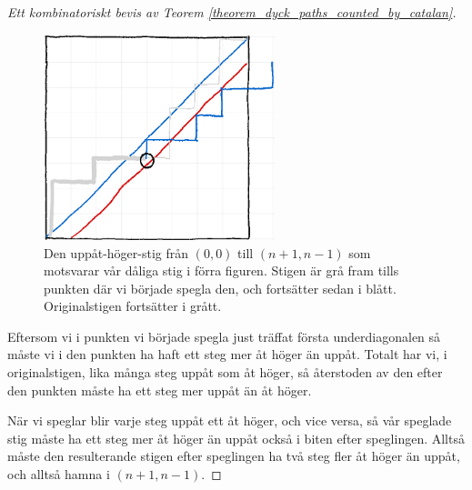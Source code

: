\documentclass{tufte-handout}
\begin{document}
\begin{proof}[Ett kombinatoriskt bevis av Teorem \ref{theorem_dyck_paths_counted_by_catalan}]
    \begin{figure}\label{fig:dyck_comb_proof_reflected_path}
        \centering
        \includegraphics[width = 0.6\textwidth]{graphics/dyck_combinatorial_proof_reflected_path.png}
        \caption{Den uppåt-höger-stig från $(0,0)$ till $(n+1,n-1)$ som motsvarar vår dåliga stig i förra figuren. Stigen är grå fram tills punkten där vi började spegla den, och fortsätter sedan i blått. Originalstigen fortsätter i grått.}
    \end{figure}

    Eftersom vi i punkten vi började spegla just träffat första underdiagonalen så måste vi i den punkten ha haft ett steg mer åt höger än uppåt. Totalt har vi, i originalstigen, lika många steg uppåt som åt höger, så återstoden av den efter den punkten måste ha ett steg mer uppåt än åt höger.

    När vi speglar blir varje steg uppåt ett åt höger, och vice versa, så vår speglade stig måste ha ett steg mer åt höger än uppåt också i biten efter speglingen. Alltså måste den resulterande stigen efter speglingen ha två steg fler åt höger än uppåt, och alltså hamna i $(n+1,n-1)$.


\end{proof}
\end{document}
